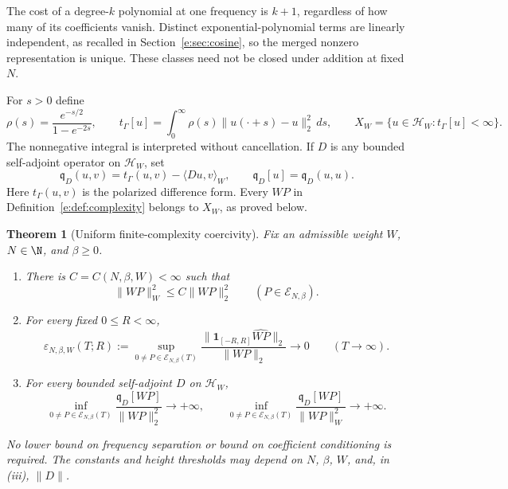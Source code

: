 \documentclass[11pt,a4paper]{article}
\numberwithin{equation}{section}
\newtheorem{theorem}{Theorem}[section]
\theoremstyle{definition}\newtheorem{definition}[theorem]{Definition}
\theoremstyle{remark}\newtheorem{remark}[theorem]{Remark}
\newcommand{\HH}{\mathcal H_W}\newcommand{\XX}{X_W}\newcommand{\EE}{\mathcal E_{N,\beta}}
\newcommand{\tg}{t_\Gamma}\newcommand{\cg}{c_\Gamma}
\newcommand{\qD}{\mathfrak q_D}\newcommand{\qth}{\mathfrak q_\theta}
\newcommand{\ip}[2]{\langle#1,#2\rangle}\newcommand{\norm}[1]{\lVert#1\rVert}\newcommand{\abs}[1]{\lvert#1\rvert}
\begin{document}
The cost of a degree-$k$ polynomial at one frequency is $k+1$, regardless
of how many of its coefficients vanish. Distinct exponential-polynomial
terms are linearly independent, as recalled in Section~\ref{e:sec:cosine},
so the merged nonzero representation is unique. These classes need not be
closed under addition at fixed $N$.

For $s>0$ define
\begin{equation}\label{e:eq:gamma-form}
 \rho(s)=\frac{e^{-s/2}}{1-e^{-2s}},\qquad
 \tg[u]=\int_0^\infty\rho(s)\norm{u(\cdot+s)-u}_2^2\,ds,
 \qquad \XX=\{u\in\HH:\tg[u]<\infty\}.
\end{equation}
The nonnegative integral is interpreted without cancellation. If $D$ is
any bounded self-adjoint operator on $\HH$, set
\begin{equation}\label{e:eq:q}
 \qD(u,v)=\tg(u,v)-\ip{Du}{v}_W,\qquad
 \qD[u]=\qD(u,u).
\end{equation}
Here $\tg(u,v)$ is the polarized difference form. Every $WP$ in
Definition~\ref{e:def:complexity} belongs to $\XX$, as proved below.

\begin{theorem}[Uniform finite-complexity coercivity]\label{e:thm:main}
Fix an admissible weight $W$, $N\in\N$, and $\beta\ge0$.
\begin{enumerate}[label=\textup{(\roman*)},leftmargin=2.1em]
\item There is $C=C(N,\beta,W)<\infty$ such that
\begin{equation}\label{e:eq:comparison}
 \norm{WP}_W^2\le C\norm{WP}_2^2\qquad(P\in\EE).
\end{equation}
\item For every fixed $0\le R<\infty$,
\begin{equation}\label{e:eq:escape}
 \varepsilon_{N,\beta,W}(T;R):=
 \sup_{0\ne P\in\EE(T)}
 \frac{\norm{\mathbf1_{[-R,R]}\widehat{WP}}_2}{\norm{WP}_2}
 \longrightarrow0\qquad(T\to\infty).
\end{equation}
\item For every bounded self-adjoint $D$ on $\HH$,
\begin{equation}\label{e:eq:coercivity}
 \inf_{0\ne P\in\EE(T)}\frac{\qD[WP]}{\norm{WP}_2^2}
 \longrightarrow+\infty,\qquad
 \inf_{0\ne P\in\EE(T)}\frac{\qD[WP]}{\norm{WP}_W^2}
 \longrightarrow+\infty.
\end{equation}
\end{enumerate}
No lower bound on frequency separation or bound on coefficient
conditioning is required. The constants and height thresholds may depend
on $N$, $\beta$, $W$, and, in \textup{(iii)}, $\norm D$.
\end{theorem}
\end{document}
